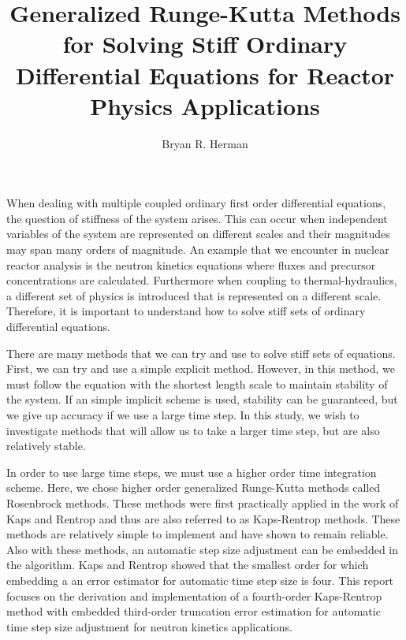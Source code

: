 \documentclass{ansconf}
\numberwithin{equation}{section}
\begin{document}
\title{Generalized Runge-Kutta Methods for Solving Stiff Ordinary Differential Equations for Reactor Physics Applications}

\author{Bryan R. Herman}

\maketitle
\thispagestyle{empty}

\pagebreak
\thispagestyle{empty}
\tableofcontents

\setcounter{page}{0}
When dealing with multiple coupled ordinary first order differential equations, the question of stiffness of the system arises. This can occur when independent variables of the system are represented on different scales and their magnitudes may span many orders of magnitude. An example that we encounter in nuclear reactor analysis is the neutron kinetics equations where fluxes and precursor concentrations are calculated. Furthermore when coupling to thermal-hydraulics, a different set of physics is introduced that is represented on a different scale. Therefore, it is important to understand how to solve stiff sets of ordinary differential equations.

There are many methods that we can try and use to solve stiff sets of equations. First, we can try and use a simple explicit method. However, in this method, we must follow the equation with the shortest length scale to maintain stability of the system. If an simple implicit scheme is used, stability can be guaranteed, but we give up accuracy if we use a large time step. In this study, we wish to investigate methods that will allow us to take a larger time step, but are also relatively stable. 

In order to use large time steps, we must use a higher order time integration scheme. Here, we chose higher order generalized Runge-Kutta methods called Rosenbrock methods. These methods were first practically applied in the work of Kaps and Rentrop and thus are also referred to as Kaps-Rentrop methods. These methods are relatively simple to implement and have shown to remain reliable. Also with these methods, an automatic step size adjustment can be embedded in the algorithm. Kaps and Rentrop showed that the smallest order for which embedding a an error estimator for automatic time step size is four. This report focuses on the derivation and implementation of a fourth-order Kaps-Rentrop method with embedded third-order truncation error estimation for automatic time step size adjustment for neutron kinetics applications.
\end{document}
